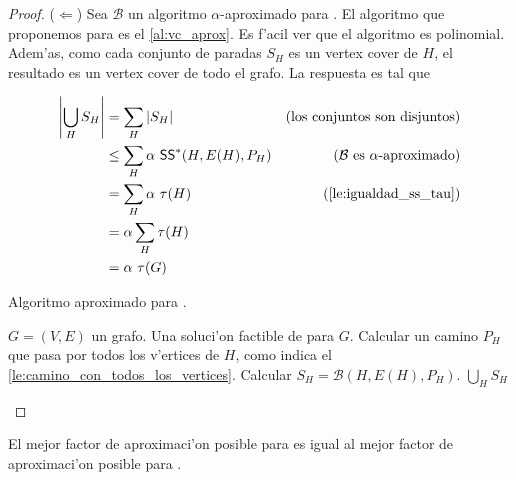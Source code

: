 \begin{theorem}
\begin{proof}
($\Leftarrow$) Sea $\mathcal{B}$ un algoritmo $\alpha$-aproximado para . El algoritmo que proponemos para  es el \autoref{al:vc_aprox}. Es f'acil ver que el algoritmo es polinomial. Adem'as, como cada conjunto de paradas $S_H$ es un vertex cover de $H$, el resultado es un vertex cover de todo el grafo. La respuesta es tal que

\begin{align*}
\left|\bigcup\limits_H S_H\right| &= \sum_H |S_H| &\text{(los conjuntos son disjuntos)}\\
&\leq \sum_H \alpha \text{ } \problem{SS}^*(H, E(H), P_H) & \text{(} \mathcal{B} \text{ es } \alpha \text{-aproximado)}\\
&= \sum_H \alpha \text{ } \tau(H) & \text{(\autoref{le:igualdad_ss_tau})}\\
&= \alpha \sum_H \tau(H) &\\
&= \alpha \text{ } \tau(G)&
\end{align*}

\begin{algorithm}
  \caption{Algoritmo aproximado para .}
  \label{al:vc_aprox}
  \begin{algorithmic}[1]
  	\Require $G = (V, E)$ un grafo.
  	\Ensure Una soluci'on factible de  para $G$.
		\State Calcular un camino $P_H$ que pasa por todos los v'ertices de $H$, como indica el \autoref{le:camino_con_todos_los_vertices}.
		\State Calcular $S_H = \mathcal{B}(H, E(H), P_H)$.
	\EndFor
	\Return $\bigcup\limits_H S_H$
  \end{algorithmic}
\end{algorithm}
\end{proof}
\end{theorem}

\begin{corollary}
El mejor factor de aproximaci'on posible para  es igual al mejor factor de aproximaci'on posible para .
\end{corollary}